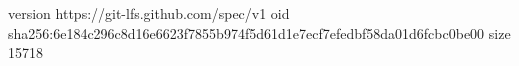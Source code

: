 version https://git-lfs.github.com/spec/v1
oid sha256:6e184c296c8d16e6623f7855b974f5d61d1e7ecf7efedbf58da01d6fcbc0be00
size 15718
